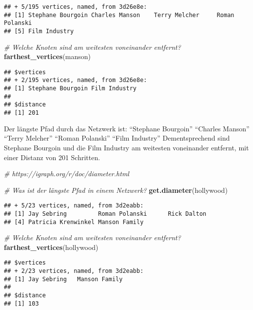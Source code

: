 \documentclass[
]{article}
\newenvironment{Shaded}{\begin{snugshade}}{\end{snugshade}}
\newcommand{\CommentTok}[1]{\textcolor[rgb]{0.56,0.35,0.01}{\textit{#1}}}
\newcommand{\KeywordTok}[1]{\textcolor[rgb]{0.13,0.29,0.53}{\textbf{#1}}}
\newcommand{\NormalTok}[1]{#1}
\begin{document}
\begin{verbatim}
## + 5/195 vertices, named, from 3d26e8e:
## [1] Stephane Bourgoin Charles Manson    Terry Melcher     Roman Polanski   
## [5] Film Industry
\end{verbatim}

\begin{Shaded}
\begin{Highlighting}[]
\CommentTok{# Welche Knoten sind am weitesten voneinander entfernt?}
\KeywordTok{farthest_vertices}\NormalTok{(manson)}
\end{Highlighting}
\end{Shaded}

\begin{verbatim}
## $vertices
## + 2/195 vertices, named, from 3d26e8e:
## [1] Stephane Bourgoin Film Industry    
## 
## $distance
## [1] 201
\end{verbatim}

Der längste Pfad durch das Netzwerk ist: ``Stephane Bourgoin'' ``Charles
Manson'' ``Terry Melcher'' ``Roman Polanski'' ``Film Industry''
Dementsprechend sind Stephane Bourgoin und die Film Industry am
weitesten voneinander entfernt, mit einer Distanz von 201 Schritten.

\begin{Shaded}
\begin{Highlighting}[]
\CommentTok{# https://igraph.org/r/doc/diameter.html}

\CommentTok{# Was ist der längste Pfad in einem Netzwerk?}
\KeywordTok{get.diameter}\NormalTok{(hollywood)}
\end{Highlighting}
\end{Shaded}

\begin{verbatim}
## + 5/23 vertices, named, from 3d2eabb:
## [1] Jay Sebring         Roman Polanski      Rick Dalton        
## [4] Patricia Krenwinkel Manson Family
\end{verbatim}

\begin{Shaded}
\begin{Highlighting}[]
\CommentTok{# Welche Knoten sind am weitesten voneinander entfernt?}
\KeywordTok{farthest_vertices}\NormalTok{(hollywood)}
\end{Highlighting}
\end{Shaded}

\begin{verbatim}
## $vertices
## + 2/23 vertices, named, from 3d2eabb:
## [1] Jay Sebring   Manson Family
## 
## $distance
## [1] 103
\end{verbatim}
\end{document}
